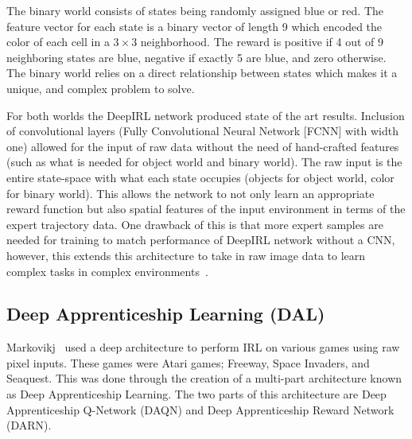 \documentclass[12pt,american]{report}
\begin{document}
The binary world consists of states being randomly assigned blue or red.  The feature vector for each state is a binary vector of length 9 which encoded the color of each cell in a $3\times 3$ neighborhood. The reward is positive if 4 out of 9 neighboring states are blue, negative if exactly 5 are blue, and zero otherwise.  The binary world relies on a direct relationship between states which makes it a unique, and complex problem to solve. 

For both worlds the DeepIRL network produced state of the art results. Inclusion of convolutional layers (Fully Convolutional Neural Network [FCNN] with width one) allowed for the input of raw data without the need of hand-crafted features (such as what is needed for object world and binary world). The raw input is the entire state-space with what each state occupies (objects for object world, color for binary world). This allows the network to not only learn an appropriate reward function but also spatial features of the input environment in terms of the expert trajectory data.  One drawback of this is that more expert samples are needed for training to match performance of DeepIRL network without a CNN, however, this extends this architecture to take in raw image data to learn complex tasks in complex environments~\cite{wulfmeier2015maximum}.

\subsection{Deep Apprenticeship Learning (DAL)}
\label{sec:DAL}
Markovikj~\cite{markovikj2014deep} used a deep architecture to perform IRL on various games using raw pixel inputs. These games were Atari games; Freeway, Space Invaders, and Seaquest. This was done through the creation of a multi-part architecture known as Deep Apprenticeship Learning. The two parts of this architecture are Deep Apprenticeship Q-Network (DAQN) and Deep Apprenticeship Reward Network (DARN).
\end{document}
